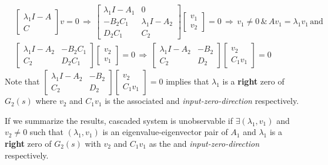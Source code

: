 \documentclass[twoside]{article}
\begin{document}
\begin{align*}
	&\left[ \begin{array}{c} \lambda_1 I - A \\ \hline C \end{array} \right] v = 0
	\, \Rightarrow \, 
	\left[ \begin{array}{c|c} \lambda_1 I - A_1 & 0 \\ \hline -B_2 C_1 &  \lambda_1 I - A_2 \\ \hline 
	D_2 C_1 & C_2
	\end{array} \right]  \begin{bmatrix} v_1 \\ v_2 \end{bmatrix} = 0
		\, \Rightarrow \, v_1 \neq 0 \, \& \, A v_1 = \lambda_1 v_1 \, \mathrm{and}
		\\
	&\left[ \begin{array}{c|c} \lambda_1 I - A_2 & -B_2 C_1 \\ \hline 
	  C_2 & D_2 C_1
	\end{array} \right]  \begin{bmatrix} v_2 \\ v_1 \end{bmatrix} = 0	
	\, \Rightarrow \, 
	\left[ \begin{array}{c|c} \lambda_1 I - A_2 & -B_2  \\ \hline 
	  C_2 & D_2 
	\end{array} \right]  \begin{bmatrix} v_2 \\ C_1 v_1 \end{bmatrix} = 0	
\end{align*}
%
Note that $\left[ \begin{array}{c|c} \lambda_1 I - A_2 & -B_2  \\ \hline 
	  C_2 & D_2 
	\end{array} \right]  \begin{bmatrix} v_2 \\ C_1 v_1 \end{bmatrix} = 0$
implies that $\lambda_1$ is a \textbf{right} zero of $G_2(s)$ where $v_2$ and $C_1 v_1$ 
is the associated  and \textit{input-zero-direction}
respectively. 

If we summarize the results, cascaded system is unobservable if $\exists (\lambda_1 , v_1)$ and $v_2 \neq 0$
such that $(\lambda_1 , v_1)$ is an eigenvalue-eigenvector pair of $A_1$ and $\lambda_1$ is a \textbf{right} zero of 
$G_2(s)$ with $v_2$ and $C_1 v_1$ as the  and \textit{input-zero-direction} respectively. 
\end{document}

